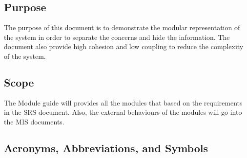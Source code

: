 \documentclass[12pt]{article}
\begin{document}
\subsection{Purpose}
The purpose of this document is to demonstrate the modular representation of the system in order to separate the concerns and hide the information. The document also provide high cohesion and low coupling to reduce the complexity of the system.

\subsection{Scope}
The Module guide will provides all the modules that based on the requirements in the SRS document. Also, the external behaviours of the modules will go into the MIS documents.
\newpage
\subsection{Acronyms, Abbreviations, and Symbols}
	
\end{document}
